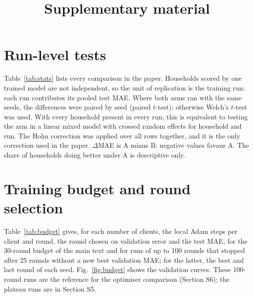 
\title{Supplementary material}

\section{Run-level tests}
Table~\ref{tab:stats} lists every comparison in the paper. Households scored by one trained model are not independent,
so the unit of replication is the training run: each run contributes its pooled test MAE. Where both arms ran with the
same seeds, the differences were paired by seed (paired $t$-test); otherwise Welch's $t$-test was used. With every
household present in every run, this is equivalent to testing the arm in a linear mixed model with crossed random
effects for household and run. The Holm correction was applied over all rows together, and it is the only correction
used in the paper. $\Delta$MAE is A minus B; negative values favour A. The share of households doing better under A is
descriptive only.

\begin{table}
\caption{Run-level comparisons ($10^{-4}$\,kWh, 95\,\% confidence interval). Test: paired by seed ($n$ pairs) or Welch
($n_A+n_B$ runs).}\label{tab:stats}

\end{table}

\section{Training budget and round selection}
Table~\ref{tab:budget} gives, for each number of clients, the local Adam steps per client and round, the round chosen
on validation error and the test MAE, for the 30-round budget of the main text and for runs of up to 100 rounds that
stopped after 25 rounds without a new best validation MAE; for the latter, the best and last round of each seed.
Fig.~\ref{fig:budget} shows the validation curves. These 100-round runs are the reference for the optimiser comparison
(Section S6); the plateau runs are in Section S5.

\begin{table}
\caption{Budget per number of clients $K$ (FedAvg, random grouping). Steps/round: Adam steps per client per round.
Best rd.: round selected on validation MAE (mean over seeds). Best / run: best round and rounds run per seed. Gap:
test MAE relative to centralised.}\label{tab:budget}

\end{table}

